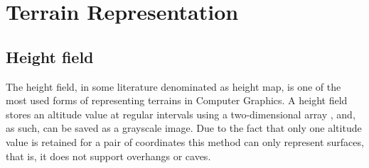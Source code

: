 


\section{Terrain Representation}


\subsection{Height field}
The height field, in some literature denominated as height map, is one of the most used forms of representing terrains in Computer Graphics. A height field stores an altitude value at regular intervals using a two-dimensional array \cite{Ebert2003}, and, as such, can be saved as a grayscale image. Due to the fact that only one altitude value is retained for a pair of coordinates this method can only represent surfaces, that is, it does not support overhangs or caves. 




